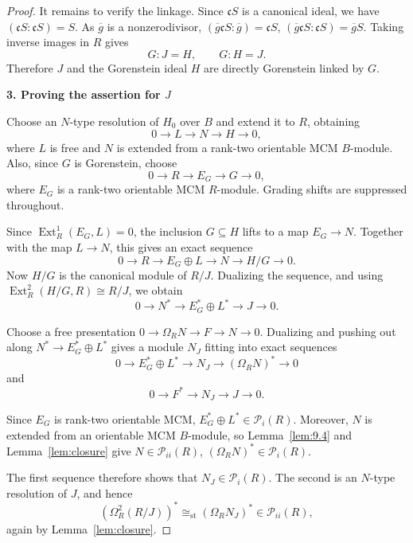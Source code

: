 \documentclass[11pt,letterpaper]{amsart}
\theoremstyle{plain}
\theoremstyle{definition}
\theoremstyle{remark}
\begin{document}
\begin{proof}
It remains to verify the linkage. Since $\mathfrak cS$ is a canonical ideal, we have $(\mathfrak cS:\mathfrak cS)=S$. As $\overline g$ is a nonzerodivisor, $(\overline g\mathfrak cS:\overline g) =\mathfrak cS$, $ (\overline g\mathfrak cS:\mathfrak cS) =\overline gS$. Taking inverse images in $R$ gives \[ G:J=H,\qquad G:H=J. \] Therefore $J$ and the Gorenstein ideal $H$ are directly Gorenstein linked by $G$.

\smallskip\noindent\textbf{3. Proving the assertion for $J$}

Choose an $N$-type resolution of $H_0$ over $B$ and extend it to $R$, obtaining \[0\longrightarrow L\longrightarrow N\longrightarrow  H\longrightarrow0,\] where $L$ is free and $N$ is extended from a rank-two orientable MCM $B$-module. Also, since $G$ is Gorenstein, choose \[ 0\longrightarrow R \longrightarrow E_G \longrightarrow G\longrightarrow0, \] where $E_G$ is a rank-two orientable MCM $R$-module. Grading shifts are suppressed throughout.

Since $\operatorname{Ext}_R^1(E_G,L)=0$,
the inclusion $G\subseteq H$ lifts to a
map $E_G\to N$. Together with the map
$L\to N$, this gives an exact sequence
\[
0\longrightarrow R
\longrightarrow E_G\oplus L
\longrightarrow N
\longrightarrow H/G\longrightarrow0.
\]
Now $H/G$ is the canonical module of $R/J$. Dualizing the sequence, and using $\operatorname{Ext}_R^2(H/G,R)\cong R/J$, we obtain \[ 0\longrightarrow N^* \longrightarrow E_G^*\oplus L^* \longrightarrow J\longrightarrow0. \]

Choose a free presentation $0\longrightarrow\Omega_R N \longrightarrow F\longrightarrow N \longrightarrow0$. Dualizing and pushing out along $N^*\to E_G^*\oplus L^*$ gives a module $N_J$ fitting into exact sequences
\[
0\longrightarrow E_G^*\oplus L^*
\longrightarrow N_J
\longrightarrow(\Omega_R N)^*
\longrightarrow0
\]
and
\[
0\longrightarrow F^*
\longrightarrow N_J\longrightarrow J
\longrightarrow0.
\]

Since $E_G$ is rank-two orientable MCM,
$E_G^*\oplus L^*\in\mathcal P_i(R)$. Moreover, $N$ is extended from an orientable MCM $B$-module, so Lemma~\ref{lem:9.4} and Lemma~\ref{lem:closure} give $N\in\mathcal P_{ii}(R)$, $(\Omega_R N)^*\in\mathcal P_i(R)$.  

The first sequence therefore shows that
$N_J\in\mathcal P_i(R)$.
The second is an $N$-type resolution of
$J$, and hence
\[
(\Omega_R^2(R/J))^*
\cong_{\mathrm{st}}(\Omega_R N_J)^*
\in\mathcal P_{ii}(R),
\]
again by Lemma~\ref{lem:closure}.


\end{proof}
\end{document}
